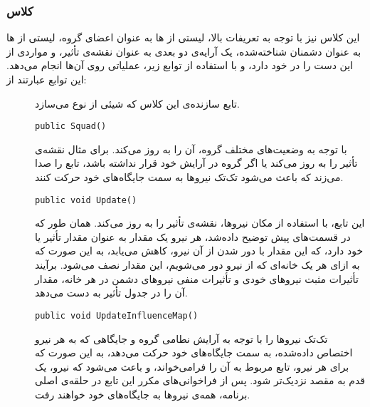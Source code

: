 \subsubsection{کلاس }
این کلاس نیز با توجه به تعریفات بالا، لیستی از ها به عنوان اعضای گروه، لیستی از ها
به عنوان دشمنان شناخته‌شده، یک آرایه‌ی دو بعدی به عنوان نقشه‌ی تأثیر، و مواردی از این دست را در خود دارد،
و با استفاده از توابع زیر، عملیاتی روی آن‌ها انجام می‌دهد. این توابع عبارتند از:
\begin{description}
  \item[]
  تابع سازنده‌ی این کلاس که شیئی از نوع  می‌سازد.
\begin{latin}
{\linespread{1.2}
{\inconsolata
\lstset{language=Java}
\begin{lstlisting}
public Squad()
\end{lstlisting}
}
}
\end{latin}

  \item[]
  با توجه به وضعیت‌های مختلف گروه، آن را به روز می‌کند. برای مثال نقشه‌ی تأثیر را به روز می‌کند یا اگر
  گروه در آرایش خود قرار نداشته باشد، تابع  را صدا می‌زند که باعث می‌شود تک‌تک نیروها
  به سمت جایگاه‌های خود حرکت کنند.
\begin{latin}
{\linespread{1.2}
{\inconsolata
\lstset{language=Java}
\begin{lstlisting}
public void Update()
\end{lstlisting}
}
}
\end{latin}
  

  \item[]
  این تابع، با استفاده از مکان نیروها، نقشه‌ی تأثیر را به روز می‌کند. همان طور که در قسمت‌های پیش
  توضیح داده‌شد، هر نیرو یک مقدار  به عنوان مقدار تأثیر یا  خود دارد، که این مقدار
  با دور شدن از آن نیرو، کاهش می‌یابد، به این صورت که به ازای هر یک خانه‌ای که از نیرو دور می‌شویم،
  این مقدار نصف می‌شود. برآیند تأثیرات مثبت نیروهای خودی و تأثیرات منفی نیروهای دشمن در هر خانه،
  مقدار آن را در جدول تأثیر به دست می‌دهد.
\begin{latin}
{\linespread{1.2}
{\inconsolata
\lstset{language=Java}
\begin{lstlisting}
public void UpdateInfluenceMap()
\end{lstlisting}
}
}
\end{latin}
  
  \item[] 
  تک‌تک نیروها را با توجه به آرایش نطامی گروه و جایگاهی که به هر نیرو اختصاص داده‌شده،
  به سمت جایگاه‌های خود حرکت می‌دهد، به این صورت که برای هر نیرو، تابع  مربوط به آن را فرامی‌خواند،
  و باعث می‌شود که نیرو، یک قدم به مقصد نزدیک‌تر شود. پس از فراخوانی‌های مکرر این تابع در حلقه‌ی اصلی برنامه،
  همه‌ی نیروها به جایگاه‌های خود خواهند رفت.
\begin{latin}
{\linespread{1.2}
{\inconsolata
\lstset{language=Java}
\begin{lstlisting}
\end{lstlisting}
}
}
\end{latin}
  

\end{description}
